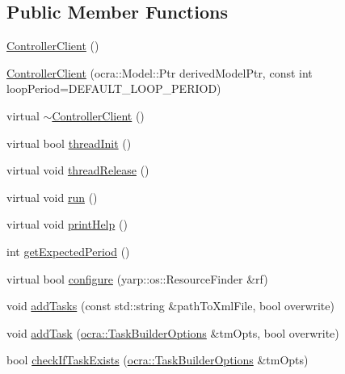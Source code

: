 \subsection*{Public Member Functions}
\begin{DoxyCompactItemize}
\item 
\hyperlink{classocra__recipes_1_1ControllerClient_acbddf372a61ee0cd20aa417527a56606}{Controller\+Client} ()
\item 
\hyperlink{classocra__recipes_1_1ControllerClient_acece74d9360b3f5508d26479f49fc3c2}{Controller\+Client} (ocra\+::\+Model\+::\+Ptr derived\+Model\+Ptr, const int loop\+Period=D\+E\+F\+A\+U\+L\+T\+\_\+\+L\+O\+O\+P\+\_\+\+P\+E\+R\+I\+OD)
\item 
virtual \hyperlink{classocra__recipes_1_1ControllerClient_a75faf6691be6c622deba404514c7ed70}{$\sim$\+Controller\+Client} ()
\item 
virtual bool \hyperlink{classocra__recipes_1_1ControllerClient_aceef962c9a3cd42dc9defcaa356d6275}{thread\+Init} ()
\item 
virtual void \hyperlink{classocra__recipes_1_1ControllerClient_ac42b7aad0b833f173475ed2a552ec159}{thread\+Release} ()
\item 
virtual void \hyperlink{classocra__recipes_1_1ControllerClient_a4a17a6233a5d824ee58115003b332c18}{run} ()
\item 
virtual void \hyperlink{classocra__recipes_1_1ControllerClient_a6bb943c2525cdc0fe82c83380c4f8900}{print\+Help} ()
\item 
int \hyperlink{classocra__recipes_1_1ControllerClient_a7ac35bd9a5eeeeb287d28e4d04c45766}{get\+Expected\+Period} ()
\item 
virtual bool \hyperlink{classocra__recipes_1_1ControllerClient_a51b18252578788100852a711d9d8f93a}{configure} (yarp\+::os\+::\+Resource\+Finder \&rf)
\item 
void \hyperlink{classocra__recipes_1_1ControllerClient_a4e86ce713e96089dd2b53aec1d8ff3e3}{add\+Tasks} (const std\+::string \&path\+To\+Xml\+File, bool overwrite)
\item 
void \hyperlink{classocra__recipes_1_1ControllerClient_a1f08768f37915c62b88e29d8db1ba27c}{add\+Task} (\hyperlink{classocra_1_1TaskBuilderOptions}{ocra\+::\+Task\+Builder\+Options} \&tm\+Opts, bool overwrite)
\item 
bool \hyperlink{classocra__recipes_1_1ControllerClient_aea41250cfe35937fc49f7261b0f356a3}{check\+If\+Task\+Exists} (\hyperlink{classocra_1_1TaskBuilderOptions}{ocra\+::\+Task\+Builder\+Options} \&tm\+Opts)
\item 

\end{DoxyCompactItemize}
